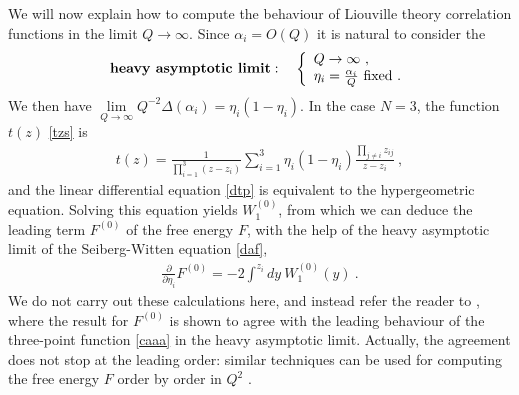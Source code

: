 \documentclass[12pt,a4paper,notitlepage]{report}
\numberwithin{equation}{section}
\theoremstyle{break}
\begin{document}
We will now explain how to compute the behaviour of Liouville theory correlation functions in the limit $Q\rightarrow \infty$.
Since $\alpha_i=O(Q)$ it is natural to consider the 
\begin{align}
 \textbf{\boldmath heavy\ asymptotic\ limit}\index{heavy\ asymptotic\ limit}: \quad \left\{\begin{array}{l}  Q \rightarrow \infty \ ,\\ \eta_i=\frac{\alpha_i}{Q}\ \text{fixed}\ .\end{array}\right.  
\end{align}
We then have $\underset{Q\rightarrow\infty}{\lim} Q^{-2}\Delta(\alpha_i)=\eta_i(1-\eta_i)$.
In the case $N=3$, the function $t(z)$ \eqref{tzs} is 
\begin{align}
 t(z) = \frac{1}{\prod_{i=1}^3(z-z_i)} \sum_{i=1}^3 \eta_i(1-\eta_i)\frac{\prod_{j\neq i} z_{ij}}{z-z_i}\ ,
\end{align}
and the linear differential equation \eqref{dtp} is equivalent to the hypergeometric equation.
Solving this equation yields $W_1^{(0)}$, from which we can deduce the leading term $F^{(0)}$ of the free energy $F$, with the help of the heavy asymptotic limit of the Seiberg-Witten equation \eqref{daf}, 
\begin{align}
 {\frac{\partial}{\partial \eta_i}} F^{(0)} = -2\int^{z_i} dy\ W_1^{(0)}(y)\ .
\end{align}
We do not carry out these calculations here, and instead refer the reader to \cite{cer12}, where the result for $F^{(0)}$ is shown to agree with the leading behaviour of the three-point function \eqref{caaa} in the heavy asymptotic limit.
Actually, the agreement does not stop at the leading order: similar techniques can be used for computing the free energy $F$ order by order in $Q^2$ \cite{cer12}.
\end{document}

